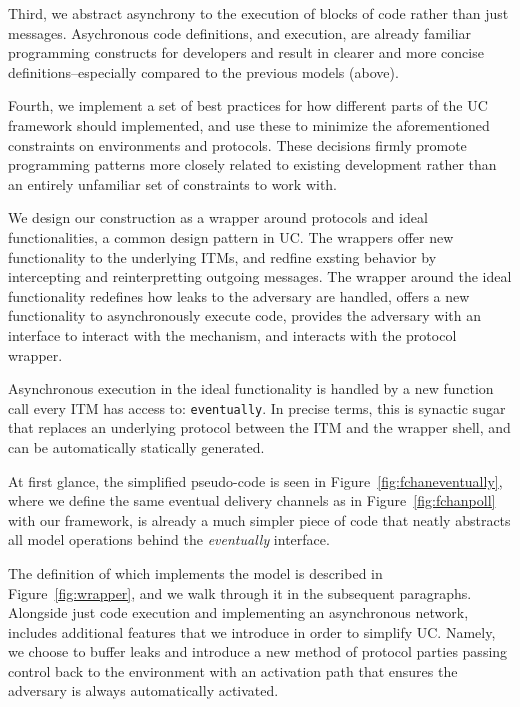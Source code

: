 Third, we abstract asynchrony to the execution of blocks of code rather than
just messages.  Asychronous code definitions, and execution, are already
familiar programming constructs for developers and result in clearer and more
concise definitions--especially compared to the previous models (above).

Fourth, we implement a set of best practices for how different parts of the UC
framework should implemented, and use these to minimize the aforementioned
constraints on environments and protocols.  These decisions firmly promote
programming patterns more closely related to existing development rather than
an entirely unfamiliar set of constraints to work with. 

We design our construction as a wrapper around protocols and ideal
functionalities, a common design pattern in UC.  The wrappers offer new
functionality to the underlying ITMs, and redfine exsting behavior by
intercepting and reinterpretting outgoing messages.  The wrapper around the
ideal functionality redefines how leaks to the adversary are handled, offers a
new functionality to asynchronously execute code, provides the adversary with
an interface to interact with the mechanism, and interacts with the protocol
wrapper.

Asynchronous execution in the ideal functionality is handled by a new function
call every ITM has access to: \texttt{eventually}.  In precise terms, this is
synactic sugar that replaces an underlying protocol between the ITM and the
wrapper shell, and can be automatically statically generated.  
\begin{figure}
 
\end{figure} 
At first glance, the simplified pseudo-code is seen in
Figure~\ref{fig:fchaneventually}, where we define the same eventual delivery
channels as in Figure~\ref{fig:fchanpoll} with our framework, is already a much
simpler piece of code that neatly abstracts all model operations behind the
\emph{eventually} interface.

The definition of \fwrapper which implements the model is described in
Figure~\ref{fig:wrapper}, and we walk through it in the subsequent paragraphs.
Alongside just code execution and implementing an asynchronous network,
\fwrapper includes additional features that we introduce in order to simplify
UC.  Namely, we choose to buffer leaks and introduce a new method of
protocol parties passing control back to the environment with an activation
path that ensures the adversary is always automatically activated.

